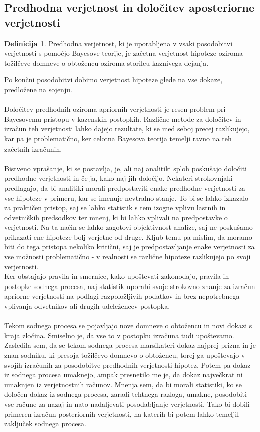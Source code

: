 \documentclass[12pt,a4paper]{amsart}
\theoremstyle{definition} %
\newtheorem{definicija}{Definicija}[section]
\theoremstyle{plain} %
\begin{document}
\subsection{Predhodna verjetnost in določitev aposteriorne verjetnosti}
\begin{definicija}
    Predhodna verjetnost, ki je uporabljena v vsaki posodobitvi verjetnosti s pomočjo Bayesove teorije, je začetna verjetnost hipoteze 
    oziroma tožilčeve domneve o obtožencu oziroma storilcu kaznivega dejanja.
\end{definicija}
Po končni posodobitvi dobimo verjetnost hipoteze glede na vse dokaze, predložene na sojenju.\\\\
Določitev predhodnih oziroma apriornih verjetnosti je resen problem pri Bayesovemu pristopu v kazenskih postopkih. Različne metode za določitev 
in izračun teh verjetnosti lahko dajejo rezultate, ki se med seboj precej razlikujejo, kar pa je problematično, ker celotna Bayesova teorija 
temelji ravno na teh začetnih izračunih.\\\\
Bistveno vprašanje, ki se postavlja, je, ali naj analitiki sploh poskušajo določiti predhodne verjetnosti in če ja, kako naj jih določijo. Nekateri 
strokovnjaki predlagajo, da bi analitiki morali predpostaviti enake predhodne verjetnosti za vse hipoteze v primeru, kar se imenuje nevtralno stanje. 
To bi se lahko izkazalo za praktičen pristop, saj se lahko statistik s tem izogne vplivu lastnih in odvetniških predsodkov ter mnenj, ki bi lahko 
vplivali na predpostavke o verjetnosti. Na ta način se lahko zagotovi objektivnost analize, saj ne poskušamo prikazati ene hipoteze bolj verjetne 
od druge. Kljub temu pa mislim, da moramo biti do tega pristopa nekoliko kritični, saj je predpostavljanje enake verjetnosti za vse možnosti 
problematično - v realnosti se različne hipoteze razlikujejo po svoji verjetnosti.\\
Ker obstajajo pravila in smernice, kako upoštevati zakonodajo, pravila in postopke sodnega procesa, naj statistik uporabi svoje strokovno znanje za 
izračun apriorne verjetnosti na podlagi razpoložljivih podatkov in brez nepotrebnega vplivanja odvetnikov ali drugih udeležencev postopka. \\\\
Tekom sodnega procesa se pojavljajo nove domneve o obtožencu in novi dokazi s kraja zločina. Smiselno je, da vse to v postopku 
izračuna tudi upoštevamo. Zasledila sem, da se tekom sodnega procesa marsikateri dokaz najprej prizna in je znan sodniku, ki presoja tožilčevo domnevo 
o obtožencu, torej ga upoštevajo v svojih izračunih za posodobitve predhodnih verjetnosti hipotez. Potem pa dokaz iz sodnega procesa umaknejo, ampak 
presnetilo me je, da dokaz največkrat ni umaknjen iz verjetnostnih računov. Mnenja sem, da bi morali statistiki, ko se določen dokaz iz 
sodnega procesa, zaradi tehtnega razloga, umakne, posodobiti vse račune za nazaj in nato nadaljevati posodabljanje verjetnosti. Tako bi dobili primeren 
izračun posteriornih verjetnosti, na katerih bi potem lahko temeljil zaključek sodnega procesa.
\end{document}
